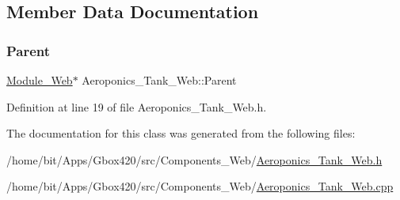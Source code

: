 \subsection{Member Data Documentation}
\mbox{\label{class_aeroponics___tank___web_a21784503514649d7972a697042809e90}} 
\subsubsection{\texorpdfstring{Parent}{Parent}}
{\footnotesize\ttfamily \hyperlink{class_module___web}{Module\+\_\+\+Web}$\ast$ Aeroponics\+\_\+\+Tank\+\_\+\+Web\+::\+Parent\hspace{0.3cm}{\ttfamily [protected]}}



Definition at line 19 of file Aeroponics\+\_\+\+Tank\+\_\+\+Web.\+h.



The documentation for this class was generated from the following files\+:\begin{DoxyCompactItemize}
\item 
/home/bit/\+Apps/\+Gbox420/src/\+Components\+\_\+\+Web/\hyperlink{_aeroponics___tank___web_8h}{Aeroponics\+\_\+\+Tank\+\_\+\+Web.\+h}\item 
/home/bit/\+Apps/\+Gbox420/src/\+Components\+\_\+\+Web/\hyperlink{_aeroponics___tank___web_8cpp}{Aeroponics\+\_\+\+Tank\+\_\+\+Web.\+cpp}\end{DoxyCompactItemize}
